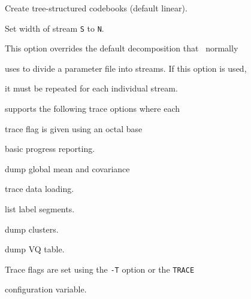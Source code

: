 \begin{optlist}
    Create tree-structured codebooks (default linear).


  


   Set width of stream \texttt{S} to \texttt{N}.


  This option overrides the default decomposition that \HTK\ normally


  uses to divide a parameter file into streams.  If this option is used,


  it must be repeated for each individual stream.


  


\stdoptF


\stdoptG


\stdoptI


\stdoptL


\stdoptX


\end{optlist}









 supports the following trace options where each


trace flag is given using an octal base


\begin{optlist}


    basic progress reporting.


    dump global mean and covariance


    trace data loading.


    list label segments.


    dump clusters.


    dump VQ table.


\end{optlist}


Trace flags are set using the \texttt{-T} option or the  \texttt{TRACE} 


configuration variable.





















